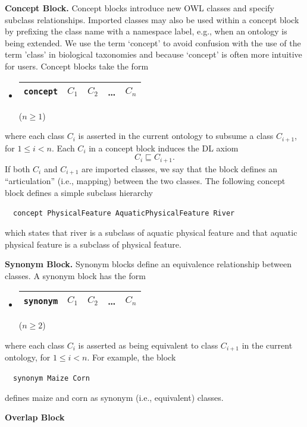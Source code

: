 \documentclass[preprint,number]{elsarticle}
\newcommand{\mypara}[1]{\vspace{12pt}\noindent\textbf{#1}}
\begin{document}
\mypara{Concept Block.} Concept blocks introduce new OWL classes and
specify subclass relationships. Imported classes may also be used
within a concept block by prefixing the class name with a namespace
label, e.g., when an ontology is being extended.  We use the term
`concept' to avoid confusion with the use of the term 'class' in
biological taxonomies and because `concept' is often more intuitive
for users. Concept blocks take the form
\begin{itemize}
\item[] 
  \begin{tabular}{|l|l|l|l|l|}\hline
    \texttt{concept} & $C_1$ & $C_2$ & \dots & $C_n$ \\ \hline 
  \end{tabular} \hfill ($n \ge 1$)
\end{itemize}
where each class $C_i$ is asserted in the current ontology to subsume
a class $C_{i+1}$, for $1 \le i < n$. Each $C_i$ in a concept block
induces the DL axiom \[C_i \sqsubseteq C_{i+1}.\] If both $C_i$ and
$C_{i+1}$ are imported classes, we say that the block defines an
``articulation'' (i.e., mapping) between the two classes. The
following concept block defines a simple subclass hierarchy
\begin{tabbing}
  ~~\texttt{concept PhysicalFeature AquaticPhysicalFeature River}
\end{tabbing}
which states that river is a subclass of aquatic physical feature and
that aquatic physical feature is a subclass of physical feature.

\mypara{Synonym Block.} Synonym blocks define an equivalence
relationship between classes.  A synonym block has the form
\begin{itemize}
\item[] 
  \begin{tabular}{|l|l|l|l|l|}\hline
    \texttt{synonym} & $C_1$ & $C_2$ & \dots & $C_n$ \\ \hline 
  \end{tabular} \hfill ($n \ge 2$)
\end{itemize}
where each class $C_i$ is asserted as being equivalent to class
$C_{i+1}$ in the current ontology, for $1 \le i < n$. For example, the
block
\begin{tabbing}
~~\texttt{synonym Maize Corn}
\end{tabbing}
defines maize and corn as synonym (i.e., equivalent) classes.


\mypara{Overlap Block} 
\end{document}
